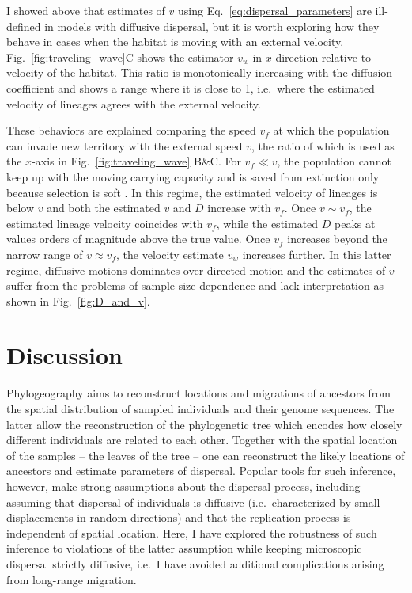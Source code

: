 \documentclass[aps,rmp, twocolumn]{revtex4}
\newcommand{\vfkpp}{v_f}
\begin{document}
I showed above that estimates of $v$ using Eq.~\ref{eq:dispersal_parameters} are ill-defined in models with diffusive dispersal, but it is worth exploring how they behave in cases when the habitat is moving with an external velocity.
Fig.~\ref{fig:traveling_wave}C shows the estimator $v_w$ in $x$ direction relative to velocity of the habitat.
This ratio is monotonically increasing with the diffusion coefficient and shows a range where it is close to 1, i.e.~where the estimated velocity of lineages agrees with the external velocity.

These behaviors are explained comparing the speed $\vfkpp$ at which the population can invade new territory with the external speed $v$, the ratio of which is used as the $x$-axis in Fig.~\ref{fig:traveling_wave} B\&C.
For $\vfkpp \ll v$, the population cannot keep up with the moving carrying capacity and is saved from extinction only because selection is soft \citep{desai_quasispecies_2005}.
In this regime, the estimated velocity of lineages is below $v$ and both the estimated $v$ and $D$ increase with $\vfkpp$.
Once $v\sim \vfkpp$, the estimated lineage velocity coincides with $\vfkpp$, while the estimated $D$ peaks at values orders of magnitude above the true value.
Once $\vfkpp$ increases beyond the narrow range of $v\approx\vfkpp$, the velocity estimate $v_w$ increases further.
In this latter regime, diffusive motions dominates over directed motion and the estimates of $v$ suffer from the problems of sample size dependence and lack interpretation as shown in Fig.~\ref{fig:D_and_v}.


\section*{Discussion}
Phylogeography aims to reconstruct locations and migrations of ancestors from the spatial distribution of sampled individuals and their genome sequences.
The latter allow the reconstruction of the phylogenetic tree which encodes how closely different individuals are related to each other.
Together with the spatial location of the samples -- the leaves of the tree -- one can reconstruct the likely locations of ancestors and estimate parameters of dispersal.
Popular tools for such inference, however, make strong assumptions about the dispersal process, including assuming that dispersal of individuals is diffusive (i.e.~characterized by small displacements in random directions) and that the replication process is independent of spatial location.
Here, I have explored the robustness of such inference to violations of the latter assumption while keeping microscopic dispersal strictly diffusive, i.e.~I have avoided additional complications arising from long-range migration.
\end{document}
